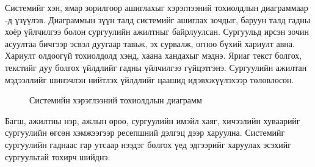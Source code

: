 Системийг хэн, ямар зорилгоор ашиглахыг хэрэглээний тохиолдлын диаграммаар -д үзүүлэв. Диаграммын зүүн талд системийг ашиглах зочдыг, баруун талд гадны хоёр үйлчилгээ болон сургуулийн ажилтныг байрлуулсан. Сургуульд ирсэн зочин асуултаа бичгээр эсвэл дуугаар тавьж, эх сурвалж, огноо бүхий хариулт авна. Хариулт олдоогүй тохиолдолд хэнд, хаана хандахыг мэднэ. Яриаг текст болгох, текстийг дуу болгох үйлдлийг гадны үйлчилгээ гүйцэтгэнэ. Сургуулийн ажилтан мэдээллийг шинэчлэн нийтлэх үйлдлийг цаашид идэвхжүүлэхээр төлөвлөсөн.

\begin{figure}[ht]
\centering
{}
\caption{Системийн хэрэглээний тохиолдлын диаграмм}
\label{fig:usecase}
\end{figure}

Багш, ажилтны нэр, ажлын өрөө, сургуулийн имэйл хаяг, хичээлийн хуваарийг сургуулийн өгсөн хэмжээгээр ресепшний дэлгэц дээр харуулна. Системийг сургуулийн гаднаас гар утсаар нээдэг болгох үед эдгээрийг харуулах эсэхийг сургуультай тохирч шийднэ.

